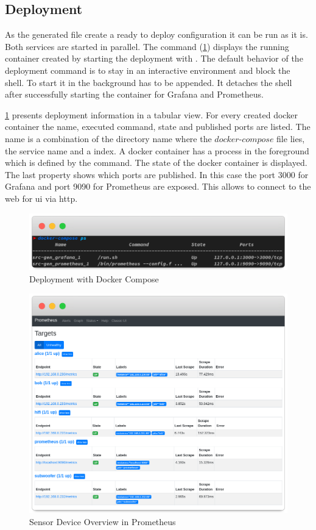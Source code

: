 \subsection{Deployment}
As the generated file create a ready to deploy configuration it can be run as it is. Both services are started in parallel. The command  (\cref{fig:deployment}) displays the running container created by starting the deployment with . The default behavior of the deployment command is to stay in an interactive environment and block the shell. To start it in the background  has to be appended. It detaches the shell after successfully starting the container for Grafana and Prometheus. 


\cref{fig:deployment} presents deployment information in a tabular view. For every created docker container the name, executed command, state and published ports are listed. The name is a combination of the directory name where the $docker\text{-}compose$ file lies, the service name and a index. A docker container has a process in the foreground which is defined by the command. The state of the docker container is displayed. The last property shows which ports are published. In this case the port 3000 for Grafana and port 9090 for Prometheus are exposed. This allows to connect to the web for \gls{ui} via \gls{http}.

\begin{figure}[!ht]
	\includegraphics[width=\linewidth]{assets/images/terminal2}
	\caption{Deployment with Docker Compose}
	\label{fig:deployment}
\end{figure}

\begin{figure}[!ht]
	\includegraphics[width=\linewidth]{assets/images/prometheus}
	\caption{Sensor Device Overview in Prometheus}
	\label{fig:prometheus}
\end{figure}

